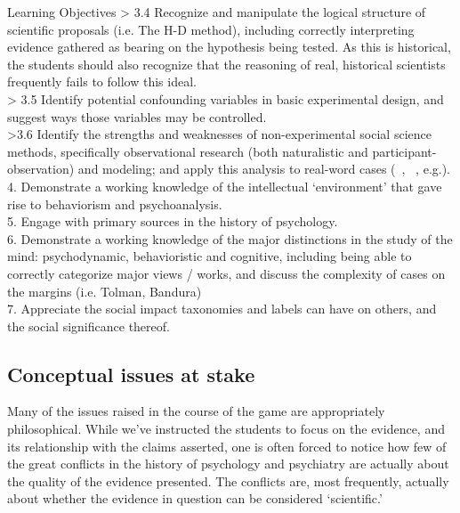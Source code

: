 \begin{refsection}
\begin{apatextbox}{Learning Objectives}
> 3.4 Recognize and manipulate the logical structure of scientific proposals (i.e. The H-D method), including correctly interpreting evidence gathered as bearing on the hypothesis being tested. As this is historical, the students should also recognize that the reasoning of real, historical scientists frequently fails to follow this ideal. \\

 > 3.5 Identify potential confounding variables in basic experimental design, and suggest ways those variables may be controlled. \\

>3.6 Identify the strengths and weaknesses of non-experimental social science methods, specifically observational research (both naturalistic and participant-observation) and modeling; and apply this analysis to real-word cases (~\citep{Rosenhan:1973uq}, ~\citep{Haney:1973wf}, e.g.). \\

4. Demonstrate a working knowledge of the intellectual ‘environment’ that gave rise to behaviorism and psychoanalysis. \\

5.  Engage with primary sources in the history of psychology. \\

6.  Demonstrate a working knowledge of the major distinctions in the study of the mind: psychodynamic, behavioristic and cognitive, including being able to correctly categorize major views / works, and discuss the complexity of cases on the margins (i.e. Tolman, Bandura) \\

7. Appreciate the social impact taxonomies and labels can have on others, and the social significance thereof. \\
\label{table: learninggoals}
\end{apatextbox}

\subsection{Conceptual issues at stake}
\label{conceptualissuesatstake}

Many of the issues raised in the course of the game are appropriately philosophical. While we've instructed the students to focus on the evidence, and its relationship with the claims asserted, one is often forced to notice how few of the great conflicts in the history of psychology and psychiatry are actually about the quality of the evidence presented. The conflicts are, most frequently, actually about whether the evidence in question can be considered `scientific.' 


\end{refsection}
